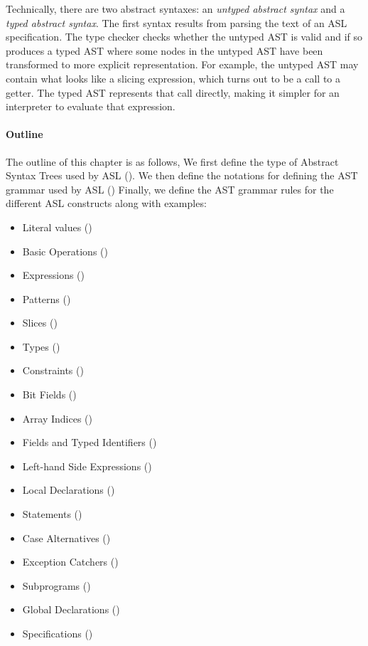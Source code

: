 \documentclass{book}
\begin{document}
Technically, there are two abstract syntaxes:
an \emph{untyped abstract syntax} and a \emph{typed abstract syntax}.
The first syntax results from parsing the text of an ASL specification.
The type checker checks whether the untyped AST is valid and if so produces
a typed AST where some nodes in the untyped AST have been transformed to
more explicit representation. For example, the untyped AST may contain
what looks like a slicing expression, which turns out to be a call to a getter.
The typed AST represents that call directly, making it simpler for an interpreter
to evaluate that expression.

\paragraph{Outline}
The outline of this chapter is as follows,
We first define the type of Abstract Syntax Trees used by ASL ().
We then define the notations for defining the AST grammar used by ASL ()
Finally, we define the AST grammar rules for the different ASL constructs along with examples:
\begin{itemize}
  \item Literal values ()
  \item Basic Operations ()
  \item Expressions ()
  \item Patterns ()
  \item Slices ()
  \item Types ()
  \item Constraints ()
  \item Bit Fields ()
  \item Array Indices ()
  \item Fields and Typed Identifiers ()
  \item Left-hand Side Expressions ()
  \item Local Declarations ()
  \item Statements ()
  \item Case Alternatives ()
  \item Exception Catchers ()
  \item Subprograms ()
  \item Global Declarations ()
  \item Specifications ()
\end{itemize}
\end{document}
